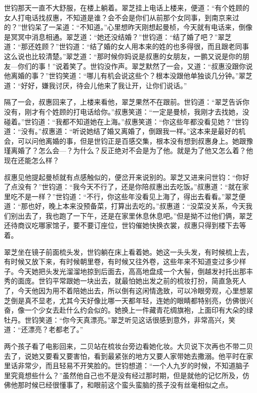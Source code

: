 \par 世钧那天一直不大舒服，在楼上躺着。翠芝挂上电话上楼来，便道：“有个姓顾的女人打电话找叔惠，不知道是谁？会不会是你们从前那个女同事，到南京来过的？”世钧呆了一呆道：“不知道。”心里想昨天刚想起曼桢，今天就有电话来，倒像是冥冥中消息相通。翠芝道：“她还没结婚？”世钧道：“结了婚了吧？”翠芝道：“那还姓顾？”世钧道：“结了婚的女人用本来的姓的也多得很，而且跟老同事这么说也比较清楚。”翠芝道：“那时候你妈说是叔惠的女朋友，一鹏又说是你的朋友—你们的事！”说着笑了。世钧没作声。翠芝默然了一会，又道：“叔惠没跟你说他离婚的事？”世钧笑道：“哪儿有机会说这些个？根本没跟他单独谈几分钟。”翠芝道：“好好，嫌我讨厌，待会儿他来了我让开，让你们说话。”
\par 隔了一会，叔惠回来了，上楼来看他，翠芝果然不在跟前。世钧道：“翠芝告诉你没有，刚才有个姓顾的打电话给你。”叔惠笑道：“一定是曼桢，我刚才去找她，没碰着。”世钧道：“我都不知道她在上海。”叔惠笑道：“你这些年都没看见她？”世钧道：“没有。”叔惠道：“听说她结了婚又离婚了，倒跟我一样。”这本来是最好的机会，可以问他离婚的事，但是世钧正是百感交集，根本没有想到叔惠身上。她跟豫瑾离婚了？怎么会—？为什么？反正绝对不会是为了他。就是为了他又怎么着？他现在还能怎么样？
\par 叔惠见他提起曼桢就有点感触似的，便岔开来说别的。翠芝又进来问世钧：“你好了点没有？”世钧道：“我今天不行了，还是你陪叔惠出去吃饭。”叔惠道：“就在家里吃不是一样？”世钧道：“不行，你这些年没看见上海了，得出去看看。”翠芝便道：“那也好，晚上本来没预备菜，打算出去吃的。”叔惠道：“没菜没关系，今天我们别出去了，我也跑了一下午，还是在家里休息休息吧。”但是拗不过他们俩，翠芝还待商议吃哪家馆子，要不要订座位，世钧催她快换衣裳，叔惠只得到楼下去等着。
\par 翠芝坐在镜子前面梳头发，世钧躺在床上看着她。她这一头头发，有时候梳上去，有时候又放下来，有时候朝里卷，有时候又往外卷，这些年来不知道变过多少样子。今天她把头发光溜溜地掠到后面去，高高地盘成一个大髻，倒越发衬托出那丰秀的面庞。世钧平常跟她一块出去，就最怕她出发之前的梳妆打扮，简直急死人了，今天他因为用不着陪她出去，所以倒有这闲情逸致，可以冷眼旁观，心里想翠芝倒是真不显老，尤其今天好像比哪一天都年轻，连她的眼睛都特别亮，仿佛很兴奋，像一个少女去赴什么约会似的。她换上一件藏青花绸旗袍，上面印有大朵的绿牡丹。世钧笑道：“你今天真漂亮。”翠芝听见这话很感到意外，非常高兴，笑道：“还漂亮？老都老了。”
\par 两个孩子看了电影回来，二贝站在梳妆台旁边看她化妆。大贝说下次再也不带二贝去了，说她又要看又要害怕，看到最紧张的地方又要人家带她去撒溺。他平时在家里话非常少，而且轻易不开笑脸的。世钧想道：“一个人九岁的时候，不知道脑子里究竟想些什么？”虽然他自己也不是没有经过那时期，但是就他的记忆所及，仿佛他那时候已经很懂事了，和眼前这个蛮头蛮脑的孩子没有丝毫相似之点。
